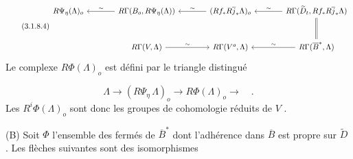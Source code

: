 \begin{equation}\tag{3.1.8.4}
\begin{tikzcd}[column sep=large, row sep=large]
R\Psi_\eta(\Lambda)_o & R\Gamma(B_o, R\Psi_\eta(\Lambda)) \arrow[l, "\sim"'] & (Rf_* R\overline{j}_* \Lambda)_o \arrow[l, "\sim"'] & R\Gamma(\widetilde{D}_t, Rf_* R\overline{j}_* \Lambda) \arrow[l, "\sim"'] \arrow[d, equal] \\
& R\Gamma(V, \Lambda) \arrow[r, "\sim"] & R\Gamma(V^o, \Lambda) & R\Gamma(\overline{B}^*, \Lambda) \arrow[l, "\sim"']
\end{tikzcd}
\end{equation}
Le complexe $R\Phi(\Lambda)_o$ est défini par le triangle distingué

\begin{equation*}
\Lambda \longrightarrow (R\Psi_\eta \, \Lambda)_o \longrightarrow R\Phi(\Lambda)_o \longrightarrow \quad .
\end{equation*}
Les $R^i\Phi(\Lambda)_o$ sont donc les groupes de cohomologie réduits de $V$ .

(B) Soit $\Phi$ l'ensemble des fermés de $\overline{B}^*$ dont l'adhérence dans $\overline{B}$ est propre sur $\widetilde{D}$ . Les flèches suivantes sont des isomorphismes

